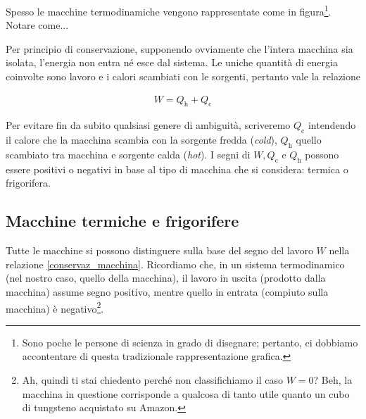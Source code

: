 %
%
%
%

Spesso le macchine termodinamiche vengono rappresentate
come in figura\footnote{Sono poche le persone di scienza in grado di disegnare;
pertanto, ci dobbiamo accontentare di questa tradizionale
rappresentazione grafica.}. Notare come...

Per principio di conservazione, supponendo
ovviamente che l'intera macchina sia isolata, l'energia
non entra né esce dal sistema. Le uniche quantità di energia
coinvolte sono lavoro e i calori scambiati con le sorgenti,
pertanto vale la relazione

\begin{align}
    W = Q_\text{h} + Q_\text{c}\label{conservaz_macchina}
\end{align}

\noindent Per evitare fin da subito qualsiasi genere di
ambiguità, scriveremo $Q_\text{c}$ intendendo il calore che
la macchina scambia con la sorgente fredda (\textit{cold}),
$Q_\text{h}$ quello scambiato tra macchina e sorgente calda
(\textit{hot}). I segni di $W, Q_\text{c}$ e $Q_\text{h}$
possono essere positivi o negativi in base al tipo di
macchina che si considera: termica o frigorifera.

\subsection{Macchine termiche e frigorifere}
Tutte le macchine si possono distinguere sulla base del segno
del lavoro $W$ nella relazione \ref{conservaz_macchina}. Ricordiamo
che, in un sistema termodinamico (nel nostro caso, quello della
macchina), il lavoro in uscita (prodotto dalla macchina) assume
segno positivo, mentre quello in entrata (compiuto sulla macchina)
è negativo\footnote{Ah, quindi ti stai chiedento perché non classifichiamo
il caso $W = 0$? Beh, la macchina in questione corrisponde a qualcosa di tanto utile quanto un
cubo di tungsteno acquistato su Amazon.}.

